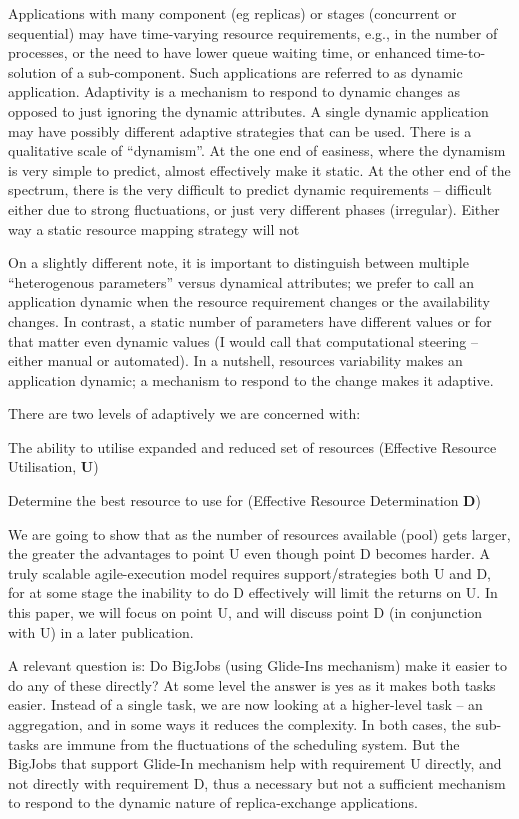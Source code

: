 \documentclass{rspublic}
\begin{document}
{Applications with many component (eg replicas) or stages (concurrent
or sequential) may have time-varying resource requirements, e.g., in
the number of processes, or the need to have lower queue waiting time,
or enhanced time-to-solution of a sub-component. Such applications are
referred to as dynamic application. Adaptivity is a mechanism to
respond to dynamic changes as opposed to just ignoring the dynamic
attributes. A single dynamic application may have possibly different
adaptive strategies that can be used. There is a qualitative scale of
``dynamism''. At the one end of easiness, where the dynamism is very
simple to predict, almost effectively make it static.  At the other
end of the spectrum, there is the very difficult to predict dynamic
requirements -- difficult either due to strong fluctuations, or just
very different phases (irregular). Either way a static resource
mapping strategy will not 

On a slightly different note, it is important to distinguish between
multiple ``heterogenous parameters'' versus dynamical attributes; we
prefer to call an application dynamic when the resource requirement
changes or the availability changes. In contrast, a static number of
parameters have different values or for that matter even dynamic
values (I would call that computational steering -- either manual or
automated). In a nutshell, resources variability makes an application
dynamic; a mechanism to respond to the change makes it adaptive.

There are two levels of adaptively we are concerned with:

\begin{compactitem}
\item  The ability to utilise expanded and reduced set of resources
    (Effective Resource Utilisation, {\bf U})
  \item Determine the best resource to use for (Effective Resource
    Determination {\bf D})
\end{compactitem}

We are going to show that as the number of resources available (pool)
gets larger, the greater the advantages to point U even though point D
becomes harder. A truly scalable agile-execution model requires
support/strategies both U and D, for at some stage the inability to do
D effectively will limit the returns on U. In this paper, we will
focus on point U, and will discuss point D (in conjunction with U) in
a later publication.

A relevant question is: Do BigJobs (using Glide-Ins mechanism) make it
easier to do any of these directly?  At some level the answer is yes
as it makes both tasks easier.  Instead of a single task, we are now
looking at a higher-level task -- an aggregation, and in some ways it
reduces the complexity.  In both cases, the sub-tasks are immune from
the fluctuations of the scheduling system.  But the BigJobs that
support Glide-In mechanism help with requirement U directly, and not
directly with requirement D, thus a necessary but not a sufficient
mechanism to respond to the dynamic nature of replica-exchange
applications.

}
\end{document}
